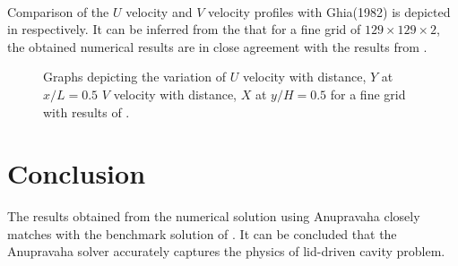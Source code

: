   \paragraph*{}
Comparison of the $U$ velocity and $V$ velocity profiles with Ghia(1982) is depicted in  respectively. It can be inferred from the  that for a fine grid of $129\times 129 \times 2$, the obtained numerical results are in close agreement with the results from \cite{Ghia1982}. 



   \begin{figure}[htb!]
	      \caption{Graphs depicting the variation of   $U$ velocity with distance, $Y$ at $x/L = 0.5$   $V$ velocity with distance, $X$ at $y/H = 0.5$ for a fine grid with results of \cite{Ghia1982}.}
	      \label{fig:FineGraph}
   \end{figure}
\newpage
\section{Conclusion}
The results obtained from the numerical solution using Anupravaha closely matches with the benchmark solution of \cite{Ghia1982}. It can be concluded that the Anupravaha solver accurately captures the physics of lid-driven cavity problem. 



